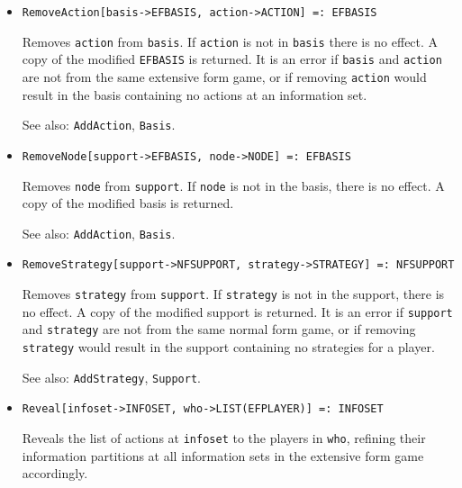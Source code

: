 \begin{itemize}
\item{}
\protect \large \begin{verbatim}
RemoveAction[basis->EFBASIS, action->ACTION] =: EFBASIS 
\end{verbatim}\normalsize
\bd
Removes \verb+action+ from \verb+basis+.  If
\verb+action+ is not in \verb+basis+ there is no
effect.  A copy of the modified \verb+EFBASIS+ is returned.  It is an error
if \verb+basis+ and \verb+action+ are not from the same extensive
form game, or if removing \verb+action+ would result in the basis
containing no actions at an information set.
\item [See also:] \verb+AddAction+, \verb+Basis+.
\ed

\item{}
\protect \large \begin{verbatim}
RemoveNode[support->EFBASIS, node->NODE] =: EFBASIS 
\end{verbatim}\normalsize

\bd
Removes \verb+node+ from \verb+support+.  If \verb+node+ is not in
the basis, there is no effect.  A copy of the modified basis is
returned.  
\item [See also:] \verb+AddAction+, \verb+Basis+.
\ed

\item{}
\protect \large \begin{verbatim}
RemoveStrategy[support->NFSUPPORT, strategy->STRATEGY] =: NFSUPPORT 
\end{verbatim}\normalsize

\bd
Removes \verb+strategy+ from \verb+support+.  If \verb+strategy+ is not in
the support, there is no effect.  A copy of the modified support is
returned.  It is an error if \verb+support+ and \verb+strategy+ are
not from the same normal form game, or if removing \verb+strategy+
would result in the support containing no strategies for a player.
\item [See also:] \verb+AddStrategy+, \verb+Support+.
\ed

\item{}
\protect \large \begin{verbatim}
Reveal[infoset->INFOSET, who->LIST(EFPLAYER)] =: INFOSET 
\end{verbatim}\normalsize

\bd
Reveals the list of actions at \verb+infoset+ to the players in \verb+who+,
refining their information partitions at
all information sets in the extensive form game accordingly.  
\ed


\end{itemize}
